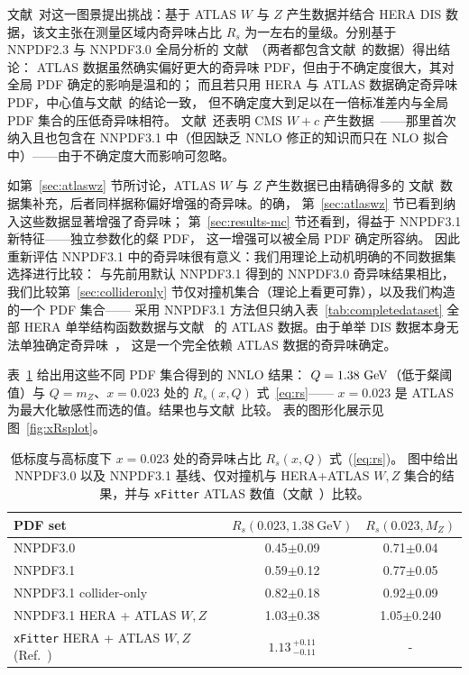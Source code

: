 文献~\cite{Aad:2012sb}对这一图景提出挑战：基于 ATLAS $W$ 与 $Z$ 产生数据并结合 HERA DIS
数据，该文主张在测量区域内奇异味占比 $R_s$ 为一左右的量级。分别基于 NNPDF2.3 与 NNPDF3.0 全局分析的
文献~\cite{Ball:2012cx,Ball:2015oha}（两者都包含文献~\cite{Aad:2012sb}的数据）得出结论：
ATLAS 数据虽然确实偏好更大的奇异味 PDF，但由于不确定度很大，其对全局 PDF 确定的影响是温和的；
而且若只用 HERA 与 ATLAS 数据确定奇异味 PDF，中心值与文献~\cite{Aad:2012sb}的结论一致，
但不确定度大到足以在一倍标准差内与全局 PDF 集合的压低奇异味相符。
文献~\cite{Ball:2015oha}还表明 CMS $W+c$ 产生数据~\cite{Chatrchyan:2013uja}——那里首次纳入且也包含在 NNPDF3.1 中（但因缺乏 NNLO 修正的知识而只在 NLO 拟合中）——由于不确定度大而影响可忽略。

如第~\ref{sec:atlaswz} 节所讨论，ATLAS $W$ 与 $Z$ 产生数据已由精确得多的
文献~\cite{Aaboud:2016btc}数据集补充，后者同样据称偏好增强的奇异味。的确，
第~\ref{sec:atlaswz} 节已看到纳入这些数据显著增强了奇异味；
第~\ref{sec:results-mc} 节还看到，得益于 NNPDF3.1 新特征——独立参数化的粲 PDF，
这一增强可以被全局 PDF 确定所容纳。
因此重新评估 NNPDF3.1 中的奇异味很有意义：我们用理论上动机明确的不同数据集选择进行比较：
与先前用默认 NNPDF3.1 得到的 NNPDF3.0 奇异味结果相比，
我们比较第~\ref{sec:collideronly} 节仅对撞机集合（理论上看更可靠），以及我们构造的一个 PDF 集合——
采用 NNPDF3.1 方法但只纳入表~\ref{tab:completedataset} 全部 HERA 单举结构函数数据与文献~\cite{Aaboud:2016btc}
的 ATLAS 数据。由于单举 DIS 数据本身无法单独确定奇异味~\cite{Forte:2010dt}，
这是一个完全依赖 ATLAS 数据的奇异味确定。

表~\ref{tab:rs} 给出用这些不同 PDF 集合得到的 NNLO 结果：
$Q=1.38~{\rm GeV}$（低于粲阈值）与 $Q=m_Z$、$x=0.023$ 处的 $R_s(x,Q)$ 式~\ref{eq:rs}——
$x=0.023$ 是 ATLAS 为最大化敏感性而选的值。结果也与文献~\cite{Aaboud:2016btc}比较。
表的图形化展示见图~\ref{fig:xRsplot}。

\begin{table}[t]
  \begin{center}
    \small
        \renewcommand{\arraystretch}{1.2}
\begin{tabular}{|l|c|c|}
\hline
\centering PDF set &  $R_s(0.023,1.38~\mathrm{GeV})$ & $R_s(0.023,M_{Z})$ \\
\hline
\hline
NNPDF3.0    & 0.45$\pm$0.09    & 0.71$\pm$0.04 \\
NNPDF3.1     & 0.59$\pm$0.12  & 0.77$\pm$0.05 \\
NNPDF3.1 collider-only   & 0.82$\pm$0.18  & 0.92$\pm$0.09 \\
NNPDF3.1 HERA + ATLAS $W,Z$   & 1.03$\pm$0.38  & 1.05$\pm$0.240\\	
\hline
{\tt xFitter} HERA + ATLAS $W,Z$ (Ref.~\cite{Aaboud:2016btc}) 	& $1.13
\,{}^{+0.11}_{-0.11}$& - \\
\hline
\end{tabular}
\end{center}
\caption{\small \label{tab:rs} 
  低标度与高标度下 $x=0.023$ 处的奇异味占比 $R_s(x,Q)$ 式~(\ref{eq:rs})。
  图中给出 NNPDF3.0 以及 NNPDF3.1 基线、仅对撞机与 HERA+ATLAS $W,Z$
  集合的结果，并与 {\tt xFitter} ATLAS 数值（文献~\cite{Aaboud:2016btc}）比较。
}
\end{table}


